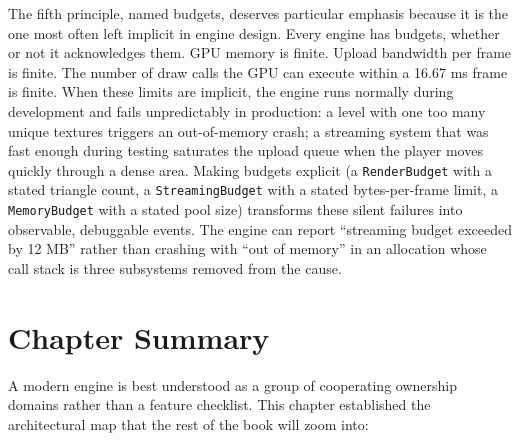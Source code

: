 \documentclass[
  11pt,
  letterpaper,
  DIV=11,
  numbers=noendperiod,
  twoside,
  open=right]{scrreprt}
\begin{document}
The fifth principle, named budgets, deserves particular emphasis because
it is the one most often left implicit in engine design. Every engine
has budgets, whether or not it acknowledges them. GPU memory is finite.
Upload bandwidth per frame is finite. The number of draw calls the GPU
can execute within a 16.67 ms frame is finite. When these limits are
implicit, the engine runs normally during development and fails
unpredictably in production: a level with one too many unique textures
triggers an out-of-memory crash; a streaming system that was fast enough
during testing saturates the upload queue when the player moves quickly
through a dense area. Making budgets explicit (a \texttt{RenderBudget}
with a stated triangle count, a \texttt{StreamingBudget} with a stated
bytes-per-frame limit, a \texttt{MemoryBudget} with a stated pool size)
transforms these silent failures into observable, debuggable events. The
engine can report ``streaming budget exceeded by 12 MB'' rather than
crashing with ``out of memory'' in an allocation whose call stack is
three subsystems removed from the cause.

\section*{Chapter Summary}\label{chapter-summary-1}


A modern engine is best understood as a group of cooperating ownership
domains rather than a feature checklist. This chapter established the
architectural map that the rest of the book will zoom into:
\end{document}
